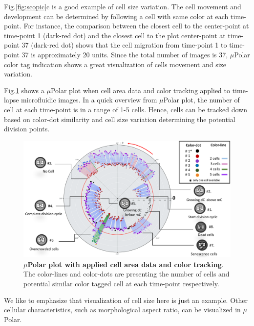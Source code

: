 \documentclass[conference]{IEEEtran}
\begin{document}
Fig.\ref{fig:scopic}c is a good example of cell size variation. The cell movement and development can be determined by following a cell with same color at each time-point. For instance, the comparison between the closest cell to the center-point at time-point 1 (dark-red dot) and the closest cell to the plot center-point at time-point 37 (dark-red dot) shows that the cell migration from time-point 1 to time-point 37 is approximately 20 units. Since the total number of images is 37, $\mu$Polar color tag indication shows a great visualization of cells  movement and size variation. 

Fig.\ref{fig:explain} shows a $\mu$Polar plot when cell area data and color tracking applied to time-lapse microfluidic images. In a quick overview from $\mu$Polar plot,  the number of cell at each time-point is in a range of 1-5 cells. Hence, cells can be tracked down based on color-dot similarity and cell size variation determining the potential division points.
 
 
\begin{figure}
\centering
\includegraphics[width=\textwidth,height=10 cm]{Patterns/explain.pdf}
\caption{ \textbf{ $\mu$Polar plot with applied cell area data and color tracking}. The color-lines and color-dots are presenting the number of cells and potential similar color tagged cell at each time-point respectively.}
\label{fig:explain}
\end{figure}

We like to emphasize that visualization of cell size here is just an example. Other cellular characteristics, such as morphological aspect ratio, can be visualized in $\mu$Polar. 
\end{document}
